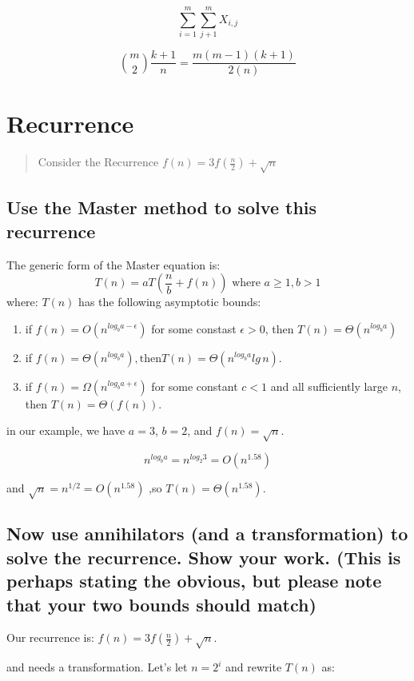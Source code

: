 \documentclass[titlepage]{article}\usepackage[]{graphicx}\usepackage[]{color}
\begin{document}
\[ \sum_{i=1}^{m}\sum_{j+1}^m X_{i,j} \] 

\[ {m \choose 2} \frac{k+1}{n} = \frac{m(m-1)(k+1)}{2(n)} \]



\section{Recurrence}

\begin{quote}
	Consider the Recurrence $f(n) = 3f(\frac{n}{2}) + \sqrt{n}$
\end{quote}

\subsection{Use the Master method to solve this recurrence}
The generic form of the Master equation is:
\[ T(n) = aT\left(\frac{n}{b} + f(n)\right) \text{ where } a\geq 1, b> 1 \]
where:
$T(n)$ has the following asymptotic bounds:
\begin{enumerate}
	\item if $f(n) = O\left(n^{log_b a-\epsilon}\right)$ for some constast
		$\epsilon > 0$, then $T(n) = \Theta(n^{log_b a})$
	\item if $f(n) = \Theta(n^{log_b a}), \text{then} T(n) =
		\Theta\left(n^{log_b a} lg\,n\right)$. 
	\item if $f(n) = \Omega\left(n^{log_b a + \epsilon}\right)$ for some
		constant $c < 1$ and all sufficiently large $n$, then $T(n) =
		\Theta(f(n))$. 
\end{enumerate}

in our example, we have $a = 3$, $b = 2$, and $f(n) = \sqrt{n}$. 

\[ n^{log_b a} = n^{log_2 3} = O(n^{1.58}) \]

and $\sqrt{n} = n^{1/2} = O(n^{1.58})$ ,so $T(n) = \Theta(n^{1.58})$.

\subsection{Now use annihilators (and a transformation) to solve the recurrence. Show
your work. (This is perhaps stating the obvious, but please note that your two
bounds should match)}
Our recurrence is: $f(n) = 3f(\frac{n}{2}) + \sqrt{n}$. 


and needs a transformation. Let's  let $n = 2^i$ and rewrite $T(n)$ as:
\end{document}
